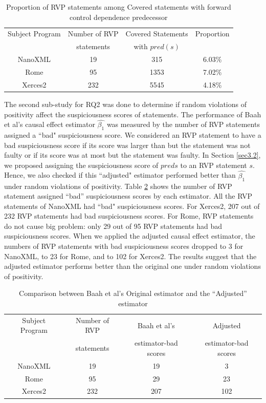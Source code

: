\begin{table}
\caption{Proportion of RVP statements among Covered statements with forward control dependence predecessor}\label{table2}
\centering
\begin{tabular}{|c|c|c|c|}
\hline
Subject Program	&	Number of RVP	&	Covered Statements	&	Proportion	\\ 
 & statements & with $pred(s)$ &\\\hline
NanoXML	&	19&	315	&	6.03\%	\\ \hline
Rome 	&	95	&	1353	&	7.02\%	\\ \hline
Xerces2 &	232	&	5545	&	4.18\%	\\ \hline

\end{tabular}
\end{table}

The second sub-study for RQ2 was done to determine if random violations of positivity affect the suspiciousness scores of statements.  The performance of Baah et al’s causal effect estimator $\widehat{\beta_1}$ was measured by the number of RVP statements assigned a ``bad" suspiciousness score.  We considered an RVP statement to have a bad suspiciousness score if its score was larger than  but the statement was not faulty or if its score was at most  but the statement was faulty.  In Section \ref{sec3.2}, we proposed assigning the suspiciousness score of $pred{s}$ to an RVP statement $s$.  Hence, we also checked if this ``adjusted" estimator performed better than $\widehat{\beta_1}$ under random violations of positivity.  Table \ref{table3} shows the number of RVP statement assigned “bad” suspiciousness scores by each estimator.  All the RVP statements of NanoXML had ``bad" suspiciousness scores.  For Xerces2, 207 out of 232 RVP statements had bad suspiciousness scores.  For Rome, RVP statements do not cause big problem: only 29 out of 95 RVP statements had bad suspiciousness scores.  When we applied the adjusted causal effect estimator, the numbers of RVP statements with bad suspiciousness scores dropped to 3 for NanoXML, to 23 for Rome, and to 102 for Xerces2.  The results suggest that the adjusted estimator performs better than the original one under random violations of positivity.
\begin{table}
\caption{Comparison between Baah et al’s  Original estimator and the ``Adjusted” estimator}\label{table3}
\centering
\begin{tabular}{|c|c|c|c|}
\hline
Subject Program	&	Number of RVP	&	Baah et al’s	&	Adjusted	\\ 
 & statements & estimator-bad scores &estimator-bad scores\\\hline
NanoXML	&	19&	19	&	3	\\ \hline
Rome 	&	95	&	29	&	23	\\ \hline
Xerces2 &	232	&	207	&	102	\\ \hline

\end{tabular}
\end{table}


